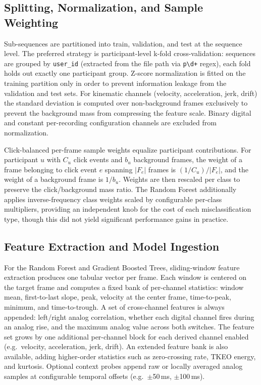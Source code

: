 \subsection{Splitting, Normalization, and Sample Weighting}
Sub-sequences are partitioned into train, validation, and test at the sequence level. The preferred strategy is participant-level k-fold cross-validation: sequences are grouped by \texttt{user\_id} (extracted from the file path via \texttt{p\textbackslash d+} regex), each fold holds out exactly one participant group. Z-score normalization is fitted on the training partition only in order to prevent information leakage from the validation and test sets. For kinematic channels (velocity, acceleration, jerk, drift) the standard deviation is computed over non-background frames exclusively to prevent the background mass from compressing the feature scale. Binary digital and constant per-recording configuration channels are excluded from normalization.

Click-balanced per-frame sample weights equalize participant contributions. For participant $u$ with $C_u$ click events and $b_u$ background frames, the weight of a frame belonging to click event $e$ spanning $|F_e|$ frames is $(1/C_u)/|F_e|$, and the weight of a background frame is $1/b_u$. Weights are then rescaled per class to preserve the click/background mass ratio. The Random Forest additionally applies inverse-frequency class weights scaled by configurable per-class multipliers, providing an independent knob for the cost of each misclassification type, though this did not yield significant performance gains in practice.

\subsection{Feature Extraction and Model Ingestion}
For the Random Forest and Gradient Boosted Trees, sliding-window feature extraction produces one tabular vector per frame. Each window is centered on the target frame and computes a fixed bank of per-channel statistics: window mean, first-to-last slope, peak, velocity at the center frame, time-to-peak, minimum, and time-to-trough. A set of cross-channel features is always appended: left/right analog correlation, whether each digital channel fires during an analog rise, and the maximum analog value across both switches. The feature set grows by one additional per-channel block for each derived channel enabled (e.g.\ velocity, acceleration, jerk, drift). An extended feature bank is also available, adding higher-order statistics such as zero-crossing rate, TKEO energy, and kurtosis. Optional context probes append raw or locally averaged analog samples at configurable temporal offsets (e.g.\ $\pm$50\,ms, $\pm$100\,ms).

